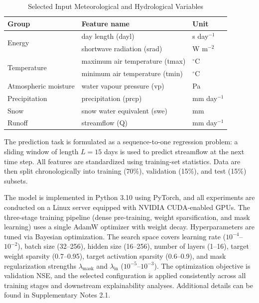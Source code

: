 \begin{table}[htbp]
	\centering
	\caption{Selected Input Meteorological and Hydrological Variables}
	\label{tab:input_features}
	\begin{tabular*}{\textwidth}{@{\extracolsep{\fill}}lll}
		\toprule
		Group & Feature name & Unit \\
		\midrule
		\multirow{2}{*}{Energy} & day length (dayl) & s day$^{-1}$ \\
		& shortwave radiation (srad) & W m$^{-2}$ \\
		\multirow{2}{*}{Temperature} & maximum air temperature (tmax) & $^\circ$C \\
		& minimum air temperature (tmin) & $^\circ$C \\
		Atmospheric moisture & water vapour pressure (vp) & Pa \\
		Precipitation & precipitation (prcp) & mm day$^{-1}$ \\
		Snow & snow water equivalent (swe) & mm \\
		Runoff & streamflow (Q) & mm day$^{-1}$ \\
		\bottomrule
	\end{tabular*}
\end{table}

The prediction task is formulated as a sequence-to-one regression problem: a sliding window of length $L=15$ days is used to predict streamflow at the next time step. All features are standardized using training-set statistics. Data are then split chronologically into training (70\%), validation (15\%), and test (15\%) subsets.

The model is implemented in Python 3.10 using PyTorch, and all experiments are conducted on a Linux server equipped with NVIDIA CUDA-enabled GPUs. The three-stage training pipeline (dense pre-training, weight sparsification, and mask learning) uses a single AdamW optimizer with weight decay. Hyperparameters are tuned via Bayesian optimization\cite{BO_OPT}. The search space covers learning rate ($10^{-4}$--$10^{-2}$), batch size (32--256), hidden size (16--256), number of layers (1--16), target weight sparsity (0.7--0.95), target activation sparsity (0.6--0.9), and mask regularization strengths $\lambda_{\mathrm{mask}}$ and $\lambda_{\mathrm{in}}$ ($10^{-5}$--$10^{-3}$). The optimization objective is validation NSE, and the selected configuration is applied consistently across all training stages and downstream explainability analyses. Additional details can be found in Supplementary Notes 2.1.